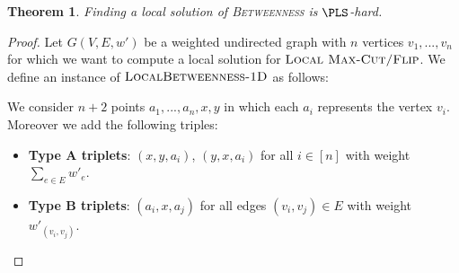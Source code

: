 \documentclass{article}
\theoremstyle{definition}  %
\theoremstyle{plain}
\newtheorem{theorem}{Theorem}
\numberwithin{observation}{section}
\numberwithin{claim}{section}
\numberwithin{fact}{section}
\numberwithin{lemma}{section}
\numberwithin{proposition}{section}
\numberwithin{theorem}{section}
\numberwithin{corollary}{section}
\numberwithin{definition}{section}
\newcommand{\betweeness}{\textsc{LocalBetweenness-1D}}
\DeclareMathOperator{\score}{score}
\theoremstyle{plain}
\begin{document}
\begin{theorem}\label{thm:betweenness-1d}
Finding a local solution of \textsc{Betweenness} is $\PLS$-hard.
\end{theorem}
\begin{proof}




Let $G(V,E,w')$ be a weighted undirected graph with $n$ vertices $v_1,...,v_n$ for which we want to compute a local solution for $\textsc{Local Max-Cut/Flip}$. We define an instance of $\betweeness$ as follows:

We consider $n+2$ points $a_1,...,a_n, x ,y$ in which each $a_i$ represents the vertex $v_i.$ Moreover we add the following triples:

\begin{itemize}[label = ]
\item \textbf{Type A triplets}: $(x,y,a_i)$, $(y,x,a_i)$ for all $i \in [n]$ with weight $\sum_{e \in E} w'_{e}$.
\item \textbf{Type B triplets}: $(a_i,x,a_j)$ for all edges $(v_i,v_j)\in E$ with weight $w'_{(v_i,v_j)}$.
\end{itemize}



\end{proof}
\end{document}
